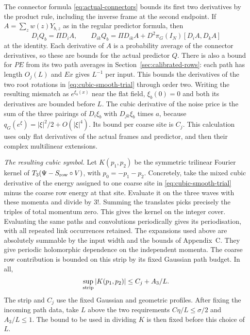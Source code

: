 \documentclass[11pt,reqno]{amsart}
\numberwithin{equation}{section}
\theoremstyle{definition}
\theoremstyle{remark}
\begin{document}
The connector formula \eqref{eq:actual-connectors} bounds
its first two derivatives by the product rule, including
the inverse frame at the second endpoint. If \(A=\sum_z w(z)Y_{b,z}\)
as in the regular predictor formula, then
\[
 D_iQ_b=\Pi D_iA,\qquad
 D_{ik}Q_b=\Pi D_{ik}A+D^2\pi_G(I_N)[D_iA,D_kA]
\]
at the identity. Each derivative of \(A\) is a probability
average of the connector derivatives, so these are bounds
for the actual predictor \(Q\). There is also a bound for \(PE\)
from its two path averages in Section~\ref{sec:calibrated-rows}:
each path has length \(O_j(L)\) and \(Ex\) gives \(L^{-1}\)
per input. This bounds the derivatives of the two root
rotations in \eqref{eq:cubic-smooth-trial} through order two.
Writing the resulting mismatch as \(e^{\xi_b(x)}\) near
the flat field, \(\xi_b(0)=0\) and both its derivatives
are bounded before \(L\). The cubic derivative of the
noise price is the sum of the three pairings of
\(D_i\xi_b\) with \(D_{jk}\xi_b\) times \(a\), because
\(q_G(e^\xi)=|\xi|^2/2+O(|\xi|^4)\). Its bound per coarse
site is \(C_j\). This calculation uses only flat
derivatives of the actual frames and predictor, and then
their complex multilinear extensions.

\smallskip\noindent
\emph{The resulting cubic symbol.}
Let \(K(p_1,p_2)\) be the symmetric trilinear Fourier
kernel of \(T_3(\Psi-S_{\rm row}\circ V)\), with
\(p_0=-p_1-p_2\). Concretely, take the mixed cubic
derivative of the energy assigned to one coarse site in
\eqref{eq:cubic-smooth-trial} minus the coarse row energy
at that site. Evaluate it on the three waves with these
momenta and divide by \(3!\). Summing the translates
picks precisely the triples of total momentum zero.
This gives the kernel on the integer cover. Evaluating
the same paths and convolutions periodically gives its
periodisation, with all repeated link occurrences retained.
The expansions used above are absolutely summable by
the input width and the bounds of Appendix~C. They give
periodic holomorphic dependence on the independent
momenta. The coarse row contribution is bounded on this
strip by its fixed Gaussian path budget. In all,
\begin{equation}
             \sup_{\rm strip}|K(p_1,p_2)|
                      \le C_j+A_3/L .
 \label{eq:cubic-kernel-before-ratio}
\end{equation}
The strip and \(C_j\) use the fixed Gaussian and geometric
profiles. After fixing the incoming path data, take \(L\)
above the two requirements \(C\eta/L\le\sigma/2\) and
\(A_3/L\le1\). The bound to be used in dividing \(K\) is
then fixed before this choice of \(L\).
\end{document}
